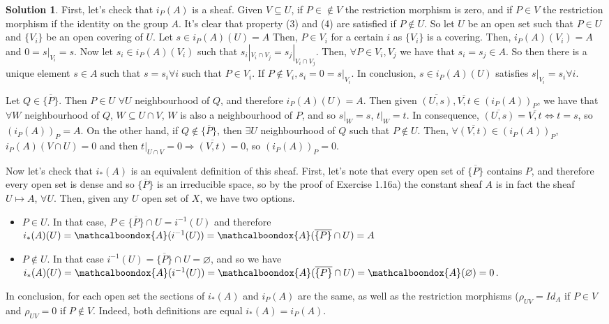 \documentclass[12pt]{article}
\newcommand{\imp}{\ensuremath{\Rightarrow}}
\theoremstyle{definition}
\newtheorem*{sol}{Solution}
\newcommand{\sA}{\ensuremath{\mathcalboondox{A}}}
\begin{document}
\begin{sol}
	First, let's check that $i_P(A)$ is a sheaf. Given $V \subseteq U$, if $P \in \notin V$ the restriction morphism is zero, and if $P \in V$ the restriction morphism if the identity on the group $A$. It's clear that property (3) and (4) are satisfied if $P \notin U$. So let $U$ be an open set such that $P \in U$ and $\{V_i\}$ be an open covering of $U$. Let $s \in i_P(A)(U) = A$ Then, $P \in V_i$ for a certain $i$ as $\{V_i\}$ is a covering. Then, $i_P(A)(V_i) = A$ and $0 = s|_{V_i} = s$. Now let $s_i \in i_P(A)(V_i)$ such that $s_i|_{V_i \cap V_j} = s_j|_{V_i \cap V_j}$. Then, $\forall P \in V_i, V_j$ we have that $s_i = s_j \in A$. So then there is a unique element $s \in A$ such that $s = s_i \forall i$ such that $P \in V_i$. If $P \notin V_i, s_i = 0 = s|_{V_i}$. In conclusion, $s \in i_P(A)(U)$ satisfies $s|_{V_i} = s_i \forall i$.

	Let $Q \in \overline{\{P\}}$. Then $P \in U \, \, \forall U$ neighbourhood of $Q$, and therefore $i_P(A)(U) = A$. Then given $\overline{(U,s)}, \overline{V,t} \in (i_P(A))_P$, we have that $\forall W$ neighbourhood of $Q$, $W \subseteq U \cap V$, $W$ is also a neighbourhood of $P$, and so $s|_W = s$, $t|_W = t$. In consequence, $\overline{(U,s)} = \overline{V,t} \iff t = s$, so $(i_P(A))_P = A$.	On the other hand, if $Q \notin \overline{\{P\}}$, then $\exists U$ neighbourhood of $Q$ such that $P \notin U$. Then, $\forall \overline{(V,t)} \in (i_P(A))_P$, $i_P(A)(V \cap U) = 0$ and then $t|_{U \cap V} = 0 \imp \overline{(V,t)} = 0$, so $(i_P(A))_P = 0$.

	Now let's check that $i_{*}(A)$ is an equivalent definition of this sheaf. First, let's note that every open set of $\overline{\{P\}}$ contains $P$, and therefore every open set is dense and so $\overline{\{P\}}$ is an irreducible space, so by the proof of Exercise 1.16a) the constant sheaf $A$ is in fact the sheaf $U \mapsto A$, $\forall U$. Then, given any $U$ open set of $X$, we have two options.
	\begin{itemize}
		\item $P \in U$. In that case, $P \in \overline{\{P\}} \cap U = i^{-1}(U)$ and therefore $i_{*}(A)(U) = \sA(i^{-1}(U)) = \sA(\overline{\{P\}} \cap U) = A$

		\item $P \notin U$. In that case $i^{-1}(U) = \overline{\{P\}} \cap U = \varnothing$, and so we have $i_{*}(A)(U) = \sA(i^{-1}(U)) = \sA(\overline{\{P\}} \cap U) = \sA(\varnothing) = 0$.
	\end{itemize}
	In conclusion, for each open set the sections of $i_{*}(A)$ and  $i_P(A)$ are the same, as well as the restriction morphisms ($\rho_{UV} = Id_A$ if $P \in V$ and $\rho_{UV} = 0$ if $P \notin V$. Indeed, both definitions are equal $i_{*}(A) = i_P(A)$.
\end{sol}
\end{document}
